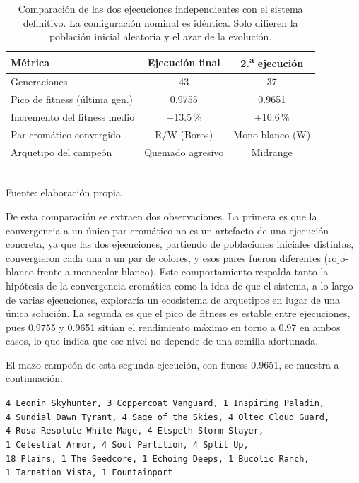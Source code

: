 \begin{table}[H]
\centering
\caption{Comparación de las dos ejecuciones independientes con el sistema definitivo. La configuración nominal es idéntica. Solo difieren la población inicial aleatoria y el azar de la evolución.}
\label{tab:dos-ejecuciones}
\begin{tabular}{lcc}
\toprule
\textbf{Métrica} & \textbf{Ejecución final} & \textbf{2.\textsuperscript{a} ejecución} \\
\midrule
Generaciones & 43 & 37 \\
Pico de fitness (última gen.) & 0.9755 & 0.9651 \\
Incremento del fitness medio & +13.5\,\% & +10.6\,\% \\
Par cromático convergido & R/W (Boros) & Mono-blanco (W) \\
Arquetipo del campeón & Quemado agresivo & Midrange \\
\bottomrule
\end{tabular}
\\[2pt]{\footnotesize Fuente: elaboración propia.}
\end{table}

De esta comparación se extraen dos observaciones. La primera es que la convergencia a un único par cromático no es un artefacto de una ejecución concreta, ya que las dos ejecuciones, partiendo de poblaciones iniciales distintas, convergieron cada una a un par de colores, y esos pares fueron diferentes (rojo-blanco frente a monocolor blanco). Este comportamiento respalda tanto la hipótesis de la convergencia cromática como la idea de que el sistema, a lo largo de varias ejecuciones, exploraría un ecosistema de arquetipos en lugar de una única solución. La segunda es que el pico de fitness es estable entre ejecuciones, pues 0.9755 y 0.9651 sitúan el rendimiento máximo en torno a 0.97 en ambos casos, lo que indica que ese nivel no depende de una semilla afortunada.

El mazo campeón de esta segunda ejecución, con fitness 0.9651, se muestra a continuación.

\begin{center}
\small
\texttt{4 Leonin Skyhunter, 3 Coppercoat Vanguard, 1 Inspiring Paladin,}\\
\texttt{4 Sundial Dawn Tyrant, 4 Sage of the Skies, 4 Oltec Cloud Guard,}\\
\texttt{4 Rosa Resolute White Mage, 4 Elspeth Storm Slayer,}\\
\texttt{1 Celestial Armor, 4 Soul Partition, 4 Split Up,}\\
\texttt{18 Plains, 1 The Seedcore, 1 Echoing Deeps, 1 Bucolic Ranch,}\\
\texttt{1 Tarnation Vista, 1 Fountainport}
\end{center}

